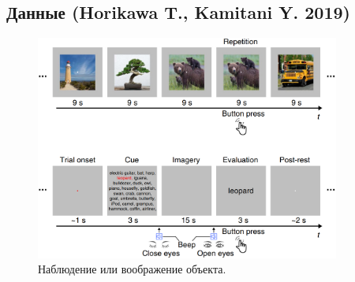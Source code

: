 \documentclass{beamer}
\begin{document}
		\subsection{Данные (Horikawa T., Kamitani Y. 2019)}
			\begin{frame}		
				\begin{figure}
					\centering
					\includegraphics[width=10cm]{../images/data_3.png}
					\caption{Наблюдение или воображение объекта.} 
				\end{figure}
			\end{frame}
		
\end{document}
